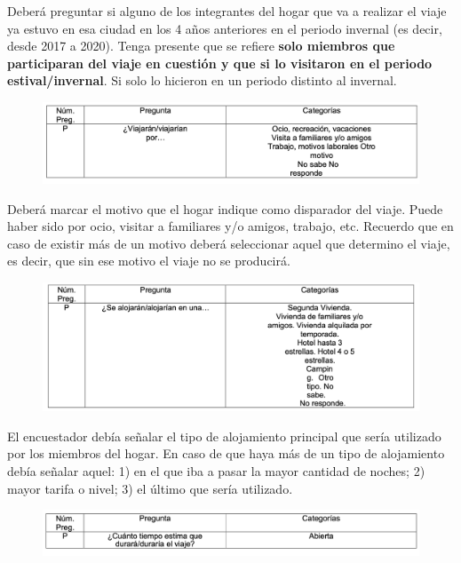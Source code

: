 \documentclass[
  openany]{book}
\begin{document}
Deberá preguntar si alguno de los integrantes del hogar que va a realizar el viaje ya estuvo en esa ciudad en los 4 años anteriores en el periodo invernal (es decir, desde 2017 a 2020). Tenga presente que se refiere \textbf{solo miembros que participaran del viaje en cuestión y que si lo visitaron en el periodo estival/invernal}. Si solo lo hicieron en un periodo distinto al invernal.

\begin{figure}

{\centering \includegraphics[width=1\linewidth]{imagenes/figura6-311} 

}

\end{figure}

Deberá marcar el motivo que el hogar indique como disparador del viaje. Puede haber sido por ocio, visitar a familiares y/o amigos, trabajo, etc. Recuerdo que en caso de existir más de un motivo deberá seleccionar aquel que determino el viaje, es decir, que sin ese motivo el viaje no se producirá.

\begin{figure}

{\centering \includegraphics[width=1\linewidth]{imagenes/figura6-312} 

}

\end{figure}

El encuestador debía señalar el tipo de alojamiento principal que sería utilizado por los miembros del hogar. En caso de que haya más de un tipo de alojamiento debía señalar aquel: 1) en el que iba a pasar la mayor cantidad de noches; 2) mayor tarifa o nivel; 3) el último que sería utilizado.

\begin{figure}

{\centering \includegraphics[width=1\linewidth]{imagenes/figura6-313} 

}

\end{figure}
\end{document}
